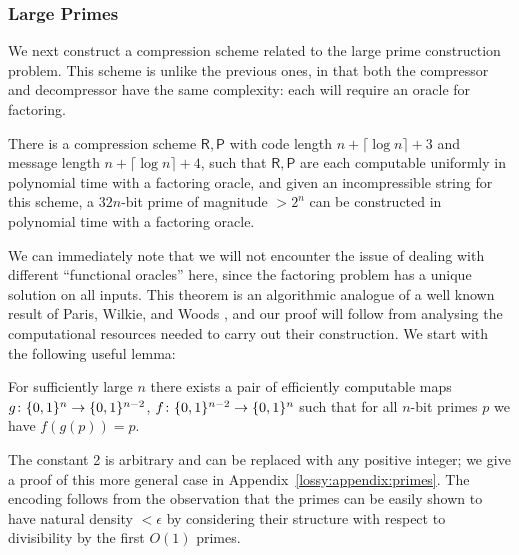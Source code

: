 \subsubsection{Large Primes}\label{lossy:subsubsec:primes}
We next construct a compression scheme related to the large prime construction problem. This scheme is unlike the previous ones, in that both the compressor and decompressor have the same complexity: each will require an oracle for factoring. 
\begin{theorem}\label{lossy:thm:primes-in-apepp}
There is a compression scheme $\mathsf{R}, \mathsf{P}$ with code length $n + \lceil \log n \rceil + 3$ and message length $n + \lceil \log n \rceil + 4$, such that $\mathsf{R},\mathsf{P}$ are each computable uniformly in polynomial time with a factoring oracle, and given an incompressible string for this scheme, a $32n$-bit prime of magnitude $>2^n$ can be constructed in polynomial time with a factoring oracle.
\end{theorem}
We can immediately note that we will not encounter the issue of dealing with different ``functional oracles'' here, since the factoring problem has a unique solution on all inputs. This theorem is an algorithmic analogue of a well known result of Paris, Wilkie, and Woods \cite{Paris-Wilkie-Woods}, and our proof will follow from analysing the computational resources needed to carry out their construction. We start with the following useful lemma:
\begin{lemma}\label{lossy:lem:divisibility-coding}
For sufficiently large $n$ there exists a pair of efficiently computable maps $g\colon \{0,1\}^n \rightarrow \{0,1\}^{n-2}$, $f\colon \{0,1\}^{n-2} \rightarrow \{0,1\}^n$ such that for all $n$-bit primes $p$ we have $f(g(p)) = p$.
\end{lemma} 
The constant 2 is arbitrary and can be replaced with any positive integer; we give a proof of this more general case in Appendix~\ref{lossy:appendix:primes}. The encoding follows from the observation that the primes can be easily shown to have natural density $< \epsilon$ by considering their structure with respect to divisibility by the first $O(1)$ primes.

